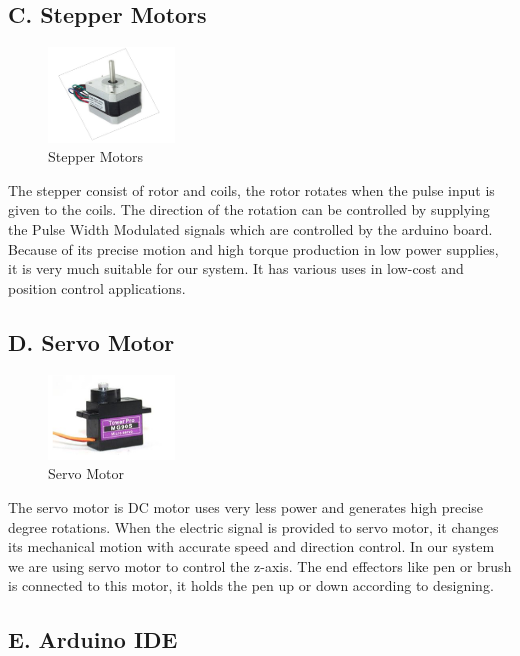 \documentclass[conference]{IEEEtran}
\begin{document}
\subsection*{\textbf{C. Stepper Motors}}

\begin{figure}[h]
    \centering
    \includegraphics[width=0.3\textwidth]{motor.png}
    \caption{Stepper Motors}
\end{figure}

The stepper consist of rotor and coils, the rotor rotates when the
pulse input is given to the coils. The direction of the rotation
can be controlled by supplying the Pulse Width Modulated
signals which are controlled by the arduino board. Because of
its precise motion and high torque production in low power
supplies, it is very much suitable for our system. It has various
uses in low-cost and position control applications.

\vspace{5pt}
\subsection*{\textbf{D. Servo Motor}}

\begin{figure}[h]
    \centering
    \includegraphics[width=0.3\textwidth]{servo.png}
    \caption{Servo Motor}
\end{figure}

The servo motor is DC motor uses very less power and
generates high precise degree rotations. When the electric
signal is provided to servo motor, it changes its mechanical
motion with accurate speed and direction control. In our system
we are using servo motor to control the z-axis. The end
effectors like pen or brush is connected to this motor, it holds
the pen up or down according to designing.

\subsection*{\textbf{E. Arduino IDE}}
\end{document}
